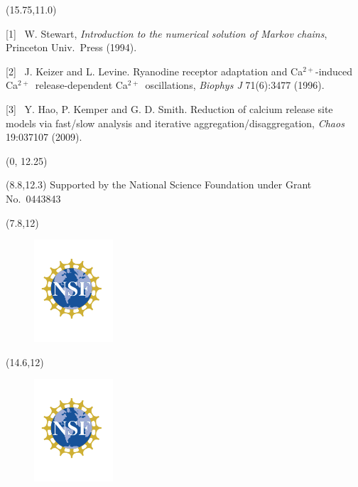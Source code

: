 \documentclass[a0]{a0poster}
\def\Ca{Ca$^{2+}$}
\def\Head#1{\noindent{\begin{center}\LARGE\color{DarkBlue} #1\end{center}}}
\begin{document}
\begin{textblock}{7.5}(15.75,11.0)
\Head{--- References ---}
\vspace{-0.3in}
\begin{description}
\item{[1]} \ W. Stewart, \textit{Introduction to the numerical solution of Markov chains}, Princeton Univ.~Press (1994).
\item{[2]} \ J. Keizer and L. Levine. Ryanodine receptor adaptation and \Ca-induced \Ca\ release-dependent \Ca\ oscillations, {\it Biophys J} 71(6):3477 (1996). 
\item{[3]} \ Y. Hao, P. Kemper and G. D. Smith.  Reduction of calcium release site models via fast/slow analysis and iterative 
aggregation/disaggregation, {\it Chaos} 19:037107 (2009).
\end{description}

\end{textblock}

\begin{textblock}{23}(0, 12.25)
\begin{center}
\color{DarkBlue}
\end{center}
\end{textblock}

\begin{textblock}{23}(8.8,12.3)
Supported by the National Science Foundation under Grant No.~0443843
\end{textblock}

\begin{textblock}{1}(7.8,12)
\begin{figure}
\includegraphics[height=1.5in]{pics/NSFlogo}
\end{figure}
\end{textblock}

\begin{textblock}{1}(14.6,12)
\begin{figure}
\includegraphics[height=1.5in]{pics/NSFlogo}
\end{figure}
\end{textblock}
\end{document}
